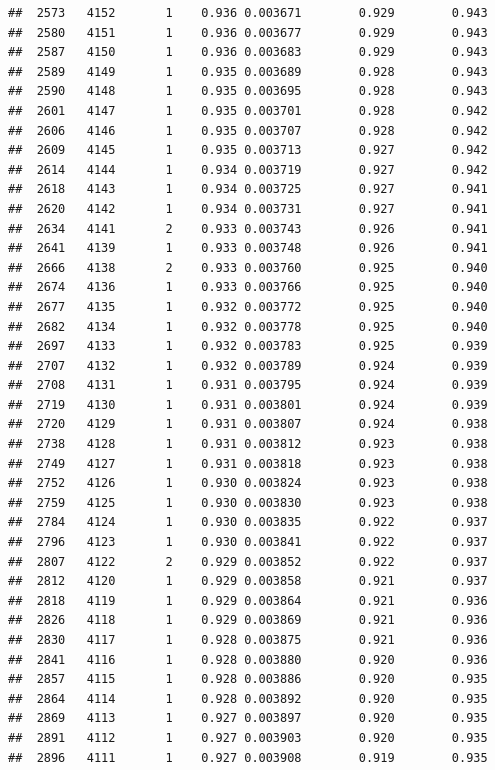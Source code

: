 \documentclass[
]{book}
\begin{document}
\begin{verbatim}
##  2573   4152       1    0.936 0.003671        0.929        0.943
##  2580   4151       1    0.936 0.003677        0.929        0.943
##  2587   4150       1    0.936 0.003683        0.929        0.943
##  2589   4149       1    0.935 0.003689        0.928        0.943
##  2590   4148       1    0.935 0.003695        0.928        0.943
##  2601   4147       1    0.935 0.003701        0.928        0.942
##  2606   4146       1    0.935 0.003707        0.928        0.942
##  2609   4145       1    0.935 0.003713        0.927        0.942
##  2614   4144       1    0.934 0.003719        0.927        0.942
##  2618   4143       1    0.934 0.003725        0.927        0.941
##  2620   4142       1    0.934 0.003731        0.927        0.941
##  2634   4141       2    0.933 0.003743        0.926        0.941
##  2641   4139       1    0.933 0.003748        0.926        0.941
##  2666   4138       2    0.933 0.003760        0.925        0.940
##  2674   4136       1    0.933 0.003766        0.925        0.940
##  2677   4135       1    0.932 0.003772        0.925        0.940
##  2682   4134       1    0.932 0.003778        0.925        0.940
##  2697   4133       1    0.932 0.003783        0.925        0.939
##  2707   4132       1    0.932 0.003789        0.924        0.939
##  2708   4131       1    0.931 0.003795        0.924        0.939
##  2719   4130       1    0.931 0.003801        0.924        0.939
##  2720   4129       1    0.931 0.003807        0.924        0.938
##  2738   4128       1    0.931 0.003812        0.923        0.938
##  2749   4127       1    0.931 0.003818        0.923        0.938
##  2752   4126       1    0.930 0.003824        0.923        0.938
##  2759   4125       1    0.930 0.003830        0.923        0.938
##  2784   4124       1    0.930 0.003835        0.922        0.937
##  2796   4123       1    0.930 0.003841        0.922        0.937
##  2807   4122       2    0.929 0.003852        0.922        0.937
##  2812   4120       1    0.929 0.003858        0.921        0.937
##  2818   4119       1    0.929 0.003864        0.921        0.936
##  2826   4118       1    0.929 0.003869        0.921        0.936
##  2830   4117       1    0.928 0.003875        0.921        0.936
##  2841   4116       1    0.928 0.003880        0.920        0.936
##  2857   4115       1    0.928 0.003886        0.920        0.935
##  2864   4114       1    0.928 0.003892        0.920        0.935
##  2869   4113       1    0.927 0.003897        0.920        0.935
##  2891   4112       1    0.927 0.003903        0.920        0.935
##  2896   4111       1    0.927 0.003908        0.919        0.935

\end{verbatim}
\end{document}
